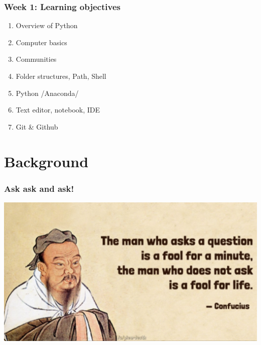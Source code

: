 \documentclass{beamer}
\begin{document}

\begin{frame}
    \frametitle{Week 1: Learning objectives}
    \begin{enumerate}
        \item Overview of Python 
        \item Computer basics
        \item Communities
        \item Folder structures, Path, Shell
        \item Python /Anaconda/
        \item Text editor, notebook, IDE
        \item Git \& Github
    \end{enumerate}
\end{frame}

\section{Background} 
\frame{\tableofcontents[currentsection]}


\begin{frame}
\frametitle{Ask ask and ask!}
\centering
\includegraphics[scale = 0.5]{figures/confucius.jpg}
\end{frame}
\end{document}
